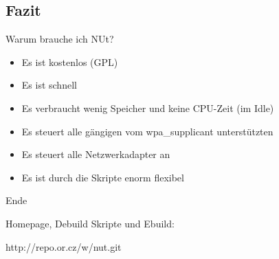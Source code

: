 \subsection{Fazit}
\begin{frame}[<+-|alert@+>]{Warum brauche ich NUt?}
	\begin{itemize}
		\item Es ist kostenlos (GPL)
		\item Es ist schnell
		\item Es verbraucht wenig Speicher und keine CPU-Zeit (im Idle)
		\item Es steuert alle gängigen vom wpa\_supplicant unterstützten
		\item Es steuert alle Netzwerkadapter an
		\item Es ist durch die Skripte enorm flexibel
	\end{itemize}
\end{frame}

\begin{frame}[<+-|alert@+>]{Ende}
	\begin{center}
		\begin{Large}
			Homepage, Debuild Skripte und Ebuild:
		\end{Large}
		\begin{Huge}
			http://repo.or.cz/w/nut.git
		\end{Huge}
	\end{center}
\end{frame}
